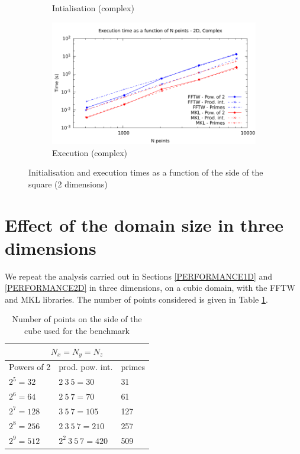 \documentclass[12pt, a4paper]{article}
\begin{document}
\begin{figure}[H]
\begin{subfigure}{.5\textwidth}
\caption{Intialisation (complex)}
\label{2DCI}
\end{subfigure}%
\begin{subfigure}{.5\textwidth}
\centering
\includegraphics[width=.9\linewidth]{graphs/2d-exec-c.pdf}
\caption{Execution (complex)}
\label{2DC}
\end{subfigure}
\caption{Initialisation and execution times as a function of the side of the square (2 dimensions)}
\label{2D}
\end{figure}

\section{Effect of the domain size in three dimensions}\label{PERFORMANCE3D}

We repeat the analysis carried out in Sections \ref{PERFORMANCE1D} and \ref{PERFORMANCE2D} in three dimensions, on a cubic domain, with  the FFTW and MKL libraries. The number of points considered is given in Table \ref{SIZES3D}.\\

\begin{table}[H]
\captionsetup{width=0.85\linewidth}
\centering
\begin{tabular}{|l|l|l|}
  \hline
  \multicolumn{3}{|c|}{$N_x=N_y=N_z$}\\
  \hline
  \hline
  Powers of 2 & prod. pow. int. & primes\\ \hline
$2^5=32$ & $2\ 3\ 5=30$	& 31\\ \hline
$2^6=64$ & $2\ 5\ 7=70$	& 61\\ \hline
$2^7=128$ & $3\ 5\ 7=105$ & 127\\ \hline
$2^8=256$ & $2\ 3\ 5\ 7=210$ & 257\\ \hline
$2^9=512$ & $2^2\ 3\ 5\ 7=420$ & 509\\ \hline
\end{tabular}
\caption{Number of points on the side of the cube used for the benchmark}\label{SIZES3D}
\end{table}
\end{document}
